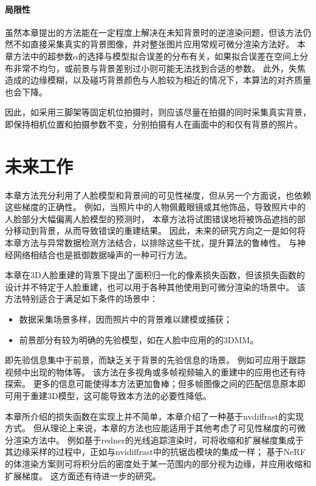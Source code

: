 \paragraph{局限性}

虽然本章提出的方法能在一定程度上解决在未知背景时的逆渲染问题，但该方法仍然不如直接采集真实的背景图像，并对整张图片应用常规可微分渲染方法好。
本章方法中的超参数$\alpha$的选择与模型拟合误差的分布有关，如果拟合误差在空间上分布非常不均匀，或前景与背景差别过小则可能无法找到合适的参数。
此外，失焦造成的边缘模糊，以及碰巧背景颜色与人脸较为相近的情况下，本算法的对齐质量也会下降。

因此，如采用三脚架等固定机位拍摄时，则应该尽量在拍摄的同时采集真实背景，即保持相机位置和拍摄参数不变，分别拍摄有人在画面中的和仅有背景的照片。

\section{未来工作}

本章方法充分利用了人脸模型和背景间的可见性梯度，但从另一个方面说，也依赖这些梯度的正确性。
例如，当照片中的人物佩戴眼镜或其他饰品，导致照片中的人脸部分大幅偏离人脸模型的预测时，
本章方法将试图错误地将被饰品遮挡的部分移动到背景，从而导致错误的重建结果。
因此，未来的研究方向之一是如何将本章方法与异常数据检测方法结合，以排除这些干扰，提升算法的鲁棒性。
与神经网络相结合也是抵御数据噪声的一种可行方法。

本章在3D人脸重建的背景下提出了面积归一化的像素损失函数，但该损失函数的设计并不特定于人脸重建，也可以用于各种其他使用到可微分渲染的场景中。
该方法特别适合于满足如下条件的场景中：
\begin{itemize}
    \item 数据采集场景多样，因而照片中的背景难以建模或捕获；
    \item 前景部分有较为明确的先验模型，如在人脸中应用的的3DMM。
\end{itemize}
即先验信息集中于前景，而缺乏关于背景的先验信息的场景。
例如可应用于跟踪视频中出现的物体等。
该方法在多视角或多帧视频输入的重建中的应用也还有待探索。
更多的信息可能使得本方法更加鲁棒；但多帧图像之间的匹配信息原本即可用于重建3D模型，这可能导致本方法的必要性降低。

本章所介绍的损失函数在实现上并不简单，本章介绍了一种基于nvdiffrast的实现方式。
但从理论上来说，本章的方法也应能适用于其他考虑了可见性梯度的可微分渲染方法中。
例如基于redner\citep{redner}的光线追踪渲染时，可将收缩和扩展梯度集成于其边缘采样的过程中，正如与nvidiffrast中的抗锯齿模块的集成一样；
基于NeRF\citep{nerf}的体渲染方案则可将积分后的密度处于某一范围内的部分视为边缘，并应用收缩和扩展梯度。
这方面还有待进一步的研究。


